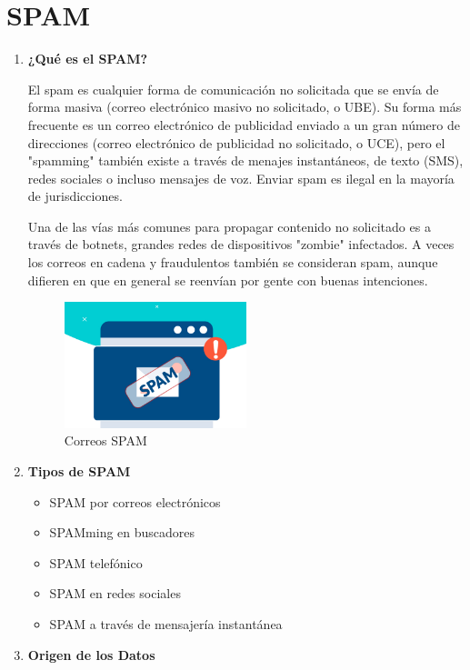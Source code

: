 \documentclass{article}
\begin{document}
	\section{SPAM}\label{sec:ejercicios}
	\begin{enumerate}
		\item \textbf{¿Qué es el SPAM?}

El spam es cualquier forma de comunicación no solicitada que se envía de forma masiva (correo electrónico masivo no solicitado, o UBE). Su forma más frecuente es un correo electrónico de publicidad enviado a un gran número de direcciones (correo electrónico de publicidad no solicitado, o UCE), pero el "spamming" también existe a través de menajes instantáneos, de texto (SMS), redes sociales o incluso mensajes de voz. Enviar spam es ilegal en la mayoría de jurisdicciones.

Una de las vías más comunes para propagar contenido no solicitado es a través de botnets, grandes redes de dispositivos "zombie" infectados. A veces los correos en cadena y fraudulentos también se consideran spam, aunque difieren en que en general se reenvían por gente con buenas intenciones.	

\begin{figure}[H]
\centering
\includegraphics[width=0.5\textwidth]{Img/spam.jpg}
\caption{Correos SPAM}
\end{figure}

\item \textbf{Tipos de SPAM}

\begin{itemize}
   \item SPAM por correos electrónicos
   \item SPAMming en buscadores
   \item SPAM telefónico
   \item SPAM en redes sociales
   \item SPAM a través de mensajería instantánea
\end{itemize}

\item \textbf{Origen de los Datos}


\end{enumerate}
\end{document}
